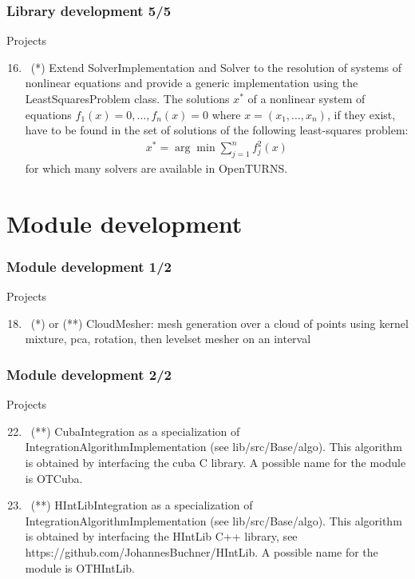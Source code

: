 \documentclass[8pt]{beamer}
\begin{document}
\begin{frame}
  \frametitle{Library development 5/5}
  \begin{block}{Projects}
    \begin{enumerate}
      \setcounter{enumi}{15}
    \item~(*) Extend \alert{\ttfamily SolverImplementation} and \alert{\ttfamily Solver} to the resolution of systems of nonlinear equations and provide a generic implementation using the \alert{\ttfamily LeastSquaresProblem} class. The solutions $x^*$ of a nonlinear system of equations $f_1(x)=0,\dots,f_n(x)=0$ where $x=(x_1,\dots,x_n)$, if they exist, have to be found in the set of solutions of the following least-squares problem:
      \begin{align}
        x^*=\arg\min \sum_{j=1}^n f_j^2(x)
      \end{align}
      for which many solvers are available in OpenTURNS.
    \end{enumerate}
  \end{block}
\end{frame}

\section{Module development}

\begin{frame}
  \frametitle{Module development 1/2}
  \begin{block}{Projects}
    \begin{enumerate}
      \setcounter{enumi}{17}
    \item~(*) or (**) \alert{\ttfamily CloudMesher}: mesh generation over a cloud of points using kernel mixture, pca, rotation, then levelset mesher on an interval
    \end{enumerate}
  \end{block}
\end{frame}

\begin{frame}
  \frametitle{Module development 2/2}
  \begin{block}{Projects}
    \begin{enumerate}
      \setcounter{enumi}{21}
    \item~(**) \alert{\ttfamily CubaIntegration} as a specialization of {\ttfamily IntegrationAlgorithmImplementation} (see {\ttfamily lib/src/Base/algo}). This algorithm is obtained by interfacing the cuba C library. A possible name for the module is \alert{OTCuba}.
    \item~(**) \alert{\ttfamily HIntLibIntegration} as a specialization of {\ttfamily IntegrationAlgorithmImplementation} (see {\ttfamily lib/src/Base/algo}). This algorithm is obtained by interfacing the HIntLib C++ library, see \alert{https://github.com/JohannesBuchner/HIntLib}. A possible name for the module is \alert{OTHIntLib}.
    \end{enumerate}
  \end{block}
\end{frame}
\end{document}
